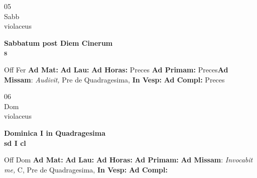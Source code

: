 \documentclass[10pt, openany]{book}
\begin{document}
    \begin{center}
        \begin{minipage}{3.5in}
            \vspace{2em}
            \begin{minipage}{0.5in}
                {\Huge 05} \\
                {\normalsize Sabb} \\
                {\normalsize violaceus}
            \end{minipage}
            \begin{minipage}{3.0in}
                \textbf{ \large Sabbatum post Diem Cinerum \\
                \textnormal{\normalsize s}} \\ 
            \end{minipage}
            \begin{justify}Off Fer
                \textbf{Ad Mat: }
                \textbf{Ad Lau: }
                \textbf{Ad Horas: }Preces
                \textbf{Ad Primam: }Preces\textbf{Ad Missam}: \textit{Audivit,} Pre de Quadragesima,  
                \textbf{In Vesp: }
                \textbf{Ad Compl: }Preces
            \end{justify}
        \end{minipage}
    \end{center}

    \begin{center}
        \begin{minipage}{3.5in}
            \vspace{2em}
            \begin{minipage}{0.5in}
                {\Huge 06} \\
                {\normalsize Dom} \\
                {\normalsize violaceus}
            \end{minipage}
            \begin{minipage}{3.0in}
                \textbf{ \large Dominica I in Quadragesima \\
                \textnormal{\normalsize sd I cl}} \\ 
            \end{minipage}
            \begin{justify}Off Dom
                \textbf{Ad Mat: }
                \textbf{Ad Lau: }
                \textbf{Ad Horas: }
                \textbf{Ad Primam: }\textbf{Ad Missam}: \textit{Invocabit me,} C, Pre de Quadragesima,  
                \textbf{In Vesp: }
                \textbf{Ad Compl: }
            \end{justify}
        \end{minipage}
    \end{center}
\end{document}
